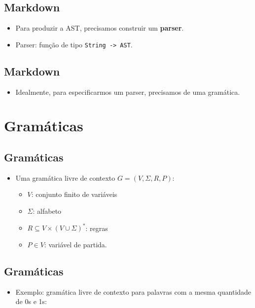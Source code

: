 \documentclass[11pt]{article}
\begin{document}
\subsection*{Markdown}
\label{sec:org245f9a2}

\begin{itemize}
\item Para produzir a AST, precisamos construir um \textbf{parser}.

\item Parser: função de tipo \texttt{String -> AST}.
\end{itemize}
\subsection*{Markdown}
\label{sec:org4c4eb12}

\begin{itemize}
\item Idealmente, para especificarmos um parser, precisamos de uma gramática.
\end{itemize}
\section*{Gramáticas}
\label{sec:org040ed4c}

\subsection*{Gramáticas}
\label{sec:org94bf7a0}

\begin{itemize}
\item Uma gramática livre de contexto \(G=(V,\Sigma,R,P)\):
\begin{itemize}
\item \(V\): conjunto finito de variáveis
\item \(\Sigma\): alfabeto
\item \(R\subseteq V \times (V\cup\Sigma)^*\): regras
\item \(P\in V\): variável de partida.
\end{itemize}
\end{itemize}
\subsection*{Gramáticas}
\label{sec:org74e5ed4}

\begin{itemize}
\item Exemplo: gramática livre de contexto para palavras com a mesma quantidade de 0s e 1s:
\end{itemize}
\end{document}
